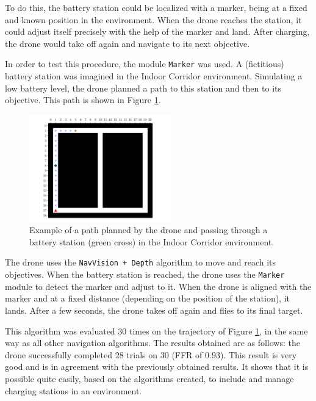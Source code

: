 To do this, the battery station could be localized with a marker, being at a fixed and known position in the environment. When the drone reaches the station, it could adjust itself precisely with the help of the marker and land. After charging, the drone would take off again and navigate to its next objective.

In order to test this procedure, the module \texttt{Marker} was used. A (fictitious) battery station was imagined in the Indoor Corridor environment. Simulating a low battery level, the drone planned a path to this station and then to its objective. This path is shown in Figure \ref{fig:06.advanced.battery.path}.

\begin{figure}[H]
    \centering
    \includegraphics[width=0.55\textwidth]{resources/pdf/06/battery/path.pdf}
    \caption{Example of a path planned by the drone and passing through a battery station (green cross) in the Indoor Corridor environment.}
    \label{fig:06.advanced.battery.path}
\end{figure}

The drone uses the \texttt{NavVision + Depth} algorithm to move and reach its objectives. When the battery station is reached, the drone uses the \texttt{Marker} module to detect the marker and adjust to it. When the drone is aligned with the marker and at a fixed distance (depending on the position of the station), it lands. After a few seconds, the drone takes off again and flies to its final target.

This algorithm was evaluated $\num{30}$ times on the trajectory of Figure \ref{fig:06.advanced.battery.path}, in the same way as all other navigation algorithms. The results obtained are as follows: the drone successfully completed $\num{28}$ trials on $\num{30}$ (FFR of $\num{0.93}$). This result is very good and is in agreement with the previously obtained results. It shows that it is possible quite easily, based on the algorithms created, to include and manage charging stations in an environment.

